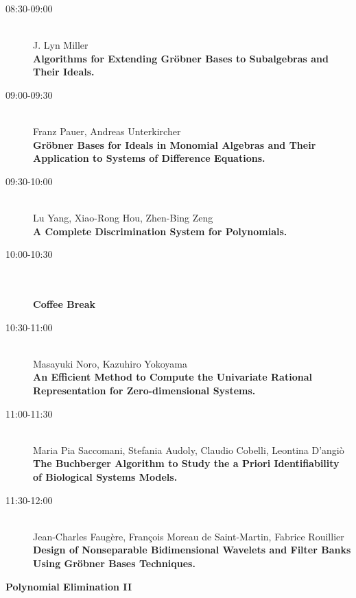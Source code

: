 \begin{description}
\item[08:30-09:00] \ \\
  J. Lyn Miller\\
  {\bf Algorithms for Extending Gr\"obner Bases to Subalgebras and Their Ideals.
} 
\item[09:00-09:30] \ \\
  Franz Pauer, Andreas Unterkircher\\
  {\bf Gr\"obner Bases for Ideals in Monomial Algebras and Their Application to Systems of
    Difference Equations.} 
\item[09:30-10:00] \ \\
  Lu Yang, Xiao-Rong Hou, Zhen-Bing Zeng
\\
  {\bf A Complete Discrimination System for Polynomials.} 
\item[10:00-10:30] \ \\
  \ \\
  {\bf Coffee Break}
\item[10:30-11:00] \ \\
  Masayuki Noro, Kazuhiro Yokoyama\\
  {\bf An Efficient Method to Compute the Univariate Rational Representation for
    Zero-dimensional Systems.} 
\item[11:00-11:30 ] \ \\
  Maria Pia Saccomani, Stefania Audoly, Claudio Cobelli, Leontina D'angi\`o
\\
  {\bf The Buchberger Algorithm to Study the a Priori Identifiability of Biological Systems
    Models.} 
\item[11:30-12:00] \ \\
  Jean-Charles Faug\`ere, Fran\c{c}ois Moreau de Saint-Martin, Fabrice Rouillier
\\
  {\bf Design of Nonseparable Bidimensional Wavelets and Filter Banks Using Gr\"obner Bases
    Techniques.} 

\end{description}

\newpage

\begin{center}
{\Large \bf Polynomial Elimination II
}
\end{center}


